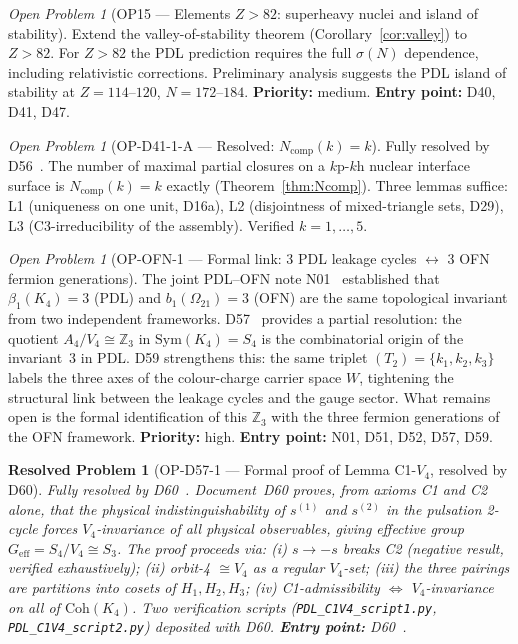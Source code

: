 \documentclass[11pt,a4paper]{article}
\newtheorem{resolvedproblem}{Resolved Problem}
\theoremstyle{plain}
\theoremstyle{definition}
\theoremstyle{remark}
\newtheorem{openproblem}[theorem]{Open Problem}
\newcommand{\Kfour}{K_4}
\newcommand{\sigmaN}{\sigma(N)}
\begin{document}
\begin{openproblem}[OP15 --- Elements $Z>82$: superheavy nuclei and island of stability]
\label{op:superheavy}
Extend the valley-of-stability theorem (Corollary~\ref{cor:valley}) to $Z>82$. For $Z>82$ the PDL prediction requires the full $\sigmaN$ dependence, including relativistic corrections. Preliminary analysis suggests the PDL island of stability at $Z=114$--$120$, $N=172$--$184$. \textbf{Priority:} medium. \textbf{Entry point:} D40, D41, D47.
\end{openproblem}

\begin{openproblem}[OP-D41-1-A --- Resolved: $N_{\mathrm{comp}}(k)=k$]
\label{op:Ncomp}
\textcolor{proofblue}{Fully resolved by D56~\cite{D56}.} The number of maximal partial closures on a $k\mathrm{p}$-$k\mathrm{h}$ nuclear interface surface is $N_{\mathrm{comp}}(k)=k$ exactly (Theorem~\ref{thm:Ncomp}). Three lemmas suffice: L1 (uniqueness on one unit, D16a), L2 (disjointness of mixed-triangle sets, D29), L3 (C3-irreducibility of the assembly). Verified $k=1,\ldots,5$.
\end{openproblem}

\begin{openproblem}[OP-OFN-1 --- Formal link: 3 PDL leakage cycles $\leftrightarrow$ 3 OFN fermion generations]
\label{op:OFN1}
The joint PDL--OFN note N01~\cite{N01} established that $\beta_1(\Kfour)=3$ (PDL) and $b_1(\Omega_{21})=3$ (OFN) are the same topological invariant from two independent frameworks. D57~\cite{D57} provides a partial resolution: the quotient $A_4/V_4 \cong \mathbb{Z}_3$ in $\mathrm{Sym}(\Kfour)=S_4$ is the combinatorial origin of the invariant~3 in PDL. D59 strengthens this: the same triplet $(T_2) = \{k_1,k_2,k_3\}$ labels the three axes of the colour-charge carrier space $W$, tightening the structural link between the leakage cycles and the gauge sector. What remains open is the formal identification of this $\mathbb{Z}_3$ with the three fermion generations of the OFN framework. \textbf{Priority:} high. \textbf{Entry point:} N01, D51, D52, D57, D59.
\end{openproblem}

\begin{resolvedproblem}[OP-D57-1 --- Formal proof of Lemma C1-$V_4$, resolved by D60]
\label{op:C1V4}
\textcolor{proofblue}{Fully resolved by D60~\cite{D60}.} Document~D60 proves, from axioms C1 and C2 alone, that the physical indistinguishability of $s^{(1)}$ and $s^{(2)}$ in the pulsation 2-cycle forces $V_4$-invariance of all physical observables, giving effective group $G_{\mathrm{eff}} = S_4/V_4 \cong S_3$. The proof proceeds via: (i) $s \to -s$ breaks C2 (negative result, verified exhaustively); (ii) orbit-4 $\cong V_4$ as a regular $V_4$-set; (iii) the three pairings are partitions into cosets of $H_1, H_2, H_3$; (iv) C1-admissibility $\Leftrightarrow$ $V_4$-invariance on all of $\mathrm{Coh}(K_4)$. Two verification scripts (\texttt{PDL\_C1V4\_script1.py}, \texttt{PDL\_C1V4\_script2.py}) deposited with D60. \textbf{Entry point:} D60~\cite{D60}.
\end{resolvedproblem}
\end{document}
